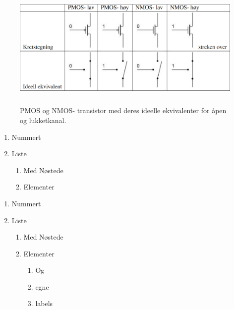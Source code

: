     \begin{figure}[!htb]
        \centering
        \includegraphics[height=6cm]{figurer/PNMOS.png}
        \caption{PMOS og NMOS- transistor med deres ideelle ekvivalenter for åpen og lukketkanal.}
        \label{fig:pnmos_transistors}
    \end{figure}

\begin{enumerate}
    \item Nummert
    \item Liste
    \begin{enumerate}
        \item Med Nøstede
        \item Elementer
    \end{enumerate}
\end{enumerate}

\begin{enumerate}[label=(\roman*)]
    \item Nummert
    \item Liste
    \begin{enumerate}[label=(\alph*)]
        \item Med Nøstede
        \item Elementer
        \begin{enumerate}[label=(\arabic*)]
            \item Og
            \item egne
            \item labels
        \end{enumerate}
    \end{enumerate}
\end{enumerate}



